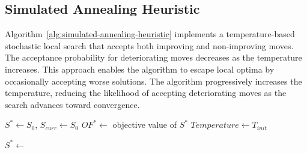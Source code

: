 \subsection{Simulated Annealing Heuristic}

Algorithm~\ref{alg:simulated-annealing-heuristic} implements a temperature-based stochastic local search that accepts both improving and non-improving moves. The acceptance probability for deteriorating moves decreases as the temperature increases. This approach enables the algorithm to escape local optima by occasionally accepting worse solutions. The algorithm progressively increases the temperature, reducing the likelihood of accepting deteriorating moves as the search advances toward convergence.

\begin{algorithm}[h!]
	\caption{Simulated Annealing} \label{alg:simulated-annealing-heuristic}
	\SetAlgoLined

	$S^* \leftarrow S_0$, $S_{curr} \leftarrow S_0$\;
	$OF^* \leftarrow$ objective value of $S^*$\;
	$Temperature \leftarrow T_{init}$\;

	$S^* \leftarrow$ \;
	\;
\end{algorithm}

